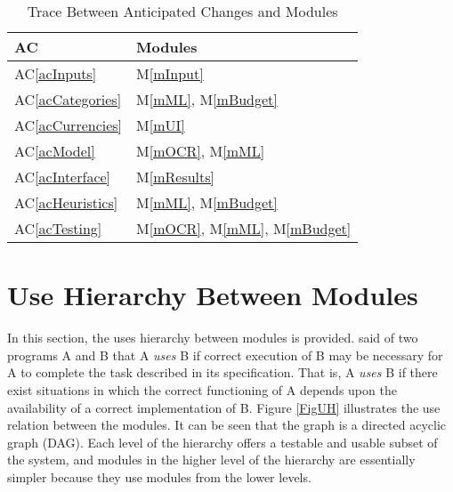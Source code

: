 \documentclass[12pt, titlepage]{article}
\newcommand{\acref}[1]{AC\ref{#1}}
\newcommand{\mref}[1]{M\ref{#1}}
\begin{document}
\begin{table}[H]
\centering
\begin{tabular}{p{} p{}}
\toprule
\textbf{AC} & \textbf{Modules}\\
\midrule
\acref{acInputs} & \mref{mInput}\\
\acref{acCategories} & \mref{mML}, \mref{mBudget}\\
\acref{acCurrencies} & \mref{mUI}\\
\acref{acModel} & \mref{mOCR}, \mref{mML}\\
\acref{acInterface} & \mref{mResults}\\
\acref{acHeuristics} & \mref{mML}, \mref{mBudget}\\
\acref{acTesting} & \mref{mOCR}, \mref{mML}, \mref{mBudget}\\
\bottomrule
\end{tabular}
\caption{Trace Between Anticipated Changes and Modules}
\label{TblACT}
\end{table}

\section{Use Hierarchy Between Modules} \label{SecUse}

In this section, the uses hierarchy between modules is
provided. \citet{Parnas1978} said of two programs A and B that A {\em uses} B if
correct execution of B may be necessary for A to complete the task described in
its specification. That is, A {\em uses} B if there exist situations in which
the correct functioning of A depends upon the availability of a correct
implementation of B.  Figure \ref{FigUH} illustrates the use relation between
the modules. It can be seen that the graph is a directed acyclic graph
(DAG). Each level of the hierarchy offers a testable and usable subset of the
system, and modules in the higher level of the hierarchy are essentially simpler
because they use modules from the lower levels.

\end{document}
